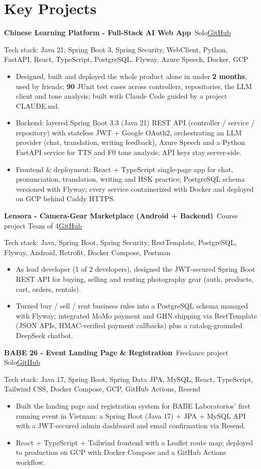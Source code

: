 \documentclass[10pt, a4paper]{article}
\newcommand{\project}[3]{\textbf{#1}\,{\color{MutedText}\textbar{} #2}\hfill\href{#3}{GitHub}\par}
\newcommand{\techstack}[1]{{\color{MutedText}Tech stack: #1}\par}
\begin{document}
\section{Key Projects}
\project{Chinese Learning Platform - Full-Stack AI Web App}{Solo}{https://github.com/minhphuong150505/Web_Chinese_Learning-}
\techstack{Java 21, Spring Boot 3, Spring Security, WebClient, Python, FastAPI, React, TypeScript, PostgreSQL, Flyway, Azure Speech, Docker, GCP}
\begin{itemize}
  \item Designed, built and deployed the whole product alone in under \textbf{2 months}, used by friends; \textbf{90} JUnit test cases across controllers, repositories, the LLM client and tone analysis; built with Claude Code guided by a project CLAUDE.md.
  \item Backend: layered Spring Boot 3.3 (Java 21) REST API (controller / service / repository) with stateless JWT + Google OAuth2, orchestrating an LLM provider (chat, translation, writing feedback), Azure Speech and a Python FastAPI service for TTS and F0 tone analysis; API keys stay server-side.
  \item Frontend \& deployment: React + TypeScript single-page app for chat, pronunciation, translation, writing and HSK practice; PostgreSQL schema versioned with Flyway; every service containerized with Docker and deployed on GCP behind Caddy HTTPS.
\end{itemize}
\vspace{2pt}
\project{Lensora - Camera-Gear Marketplace (Android + Backend)}{Course project \textbullet{} Team of 4}{https://github.com/minhphuong150505/Lensora}
\techstack{Java, Spring Boot, Spring Security, RestTemplate, PostgreSQL, Flyway, Android, Retrofit, Docker Compose, Postman}
\begin{itemize}
  \item As lead developer (1 of 2 developers), designed the JWT-secured Spring Boot REST API for buying, selling and renting photography gear (auth, products, cart, orders, rentals).
  \item Turned buy / sell / rent business rules into a PostgreSQL schema managed with Flyway; integrated MoMo payment and GHN shipping via RestTemplate (JSON APIs, HMAC-verified payment callbacks) plus a catalog-grounded DeepSeek chatbot.
\end{itemize}
\vspace{2pt}
\project{BABE 26 - Event Landing Page \& Registration}{Freelance project \textbullet{} Solo}{https://github.com/minhphuong150505/landing-page}
\techstack{Java 17, Spring Boot, Spring Data JPA, MySQL, React, TypeScript, Tailwind CSS, Docker Compose, GCP, GitHub Actions, Resend}
\begin{itemize}
  \item Built the landing page and registration system for BABE Laboratorios' first running event in Vietnam: a Spring Boot (Java 17) + JPA + MySQL API with a JWT-secured admin dashboard and email confirmation via Resend.
  \item React + TypeScript + Tailwind frontend with a Leaflet route map; deployed to production on GCP with Docker Compose and a GitHub Actions workflow.
\end{itemize}
\end{document}
